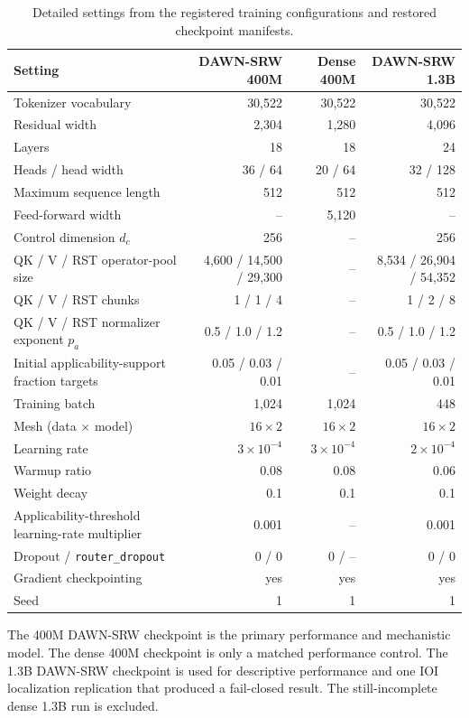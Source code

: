 \documentclass{article}
\newcommand{\DAWN}{DAWN-SRW}
\begin{document}
\begin{table}[!t]
\centering
\caption{Detailed settings from the registered training configurations and
restored checkpoint manifests.}
\scriptsize
\renewcommand{\arraystretch}{0.94}
\begin{tabular}{lrrr}
\toprule
Setting & \DAWN{} 400M & Dense 400M & \DAWN{} 1.3B\\
\midrule
Tokenizer vocabulary & 30,522 & 30,522 & 30,522\\
Residual width & 2,304 & 1,280 & 4,096\\
Layers & 18 & 18 & 24\\
Heads / head width & 36 / 64 & 20 / 64 & 32 / 128\\
Maximum sequence length & 512 & 512 & 512\\
Feed-forward width & -- & 5,120 & --\\
Control dimension \(d_c\) & 256 & -- & 256\\
QK / V / RST operator-pool size & 4,600 / 14,500 / 29,300 & -- &
8,534 / 26,904 / 54,352\\
QK / V / RST chunks & 1 / 1 / 4 & -- & 1 / 2 / 8\\
QK / V / RST normalizer exponent \(p_a\) & 0.5 / 1.0 / 1.2 & -- &
0.5 / 1.0 / 1.2\\
Initial applicability-support fraction targets & 0.05 / 0.03 / 0.01 & -- &
0.05 / 0.03 / 0.01\\
Training batch & 1,024 & 1,024 & 448\\
Mesh (data \(\times\) model) & \(16\times2\) & \(16\times2\) & \(16\times2\)\\
Learning rate & \(3\times10^{-4}\) & \(3\times10^{-4}\) & \(2\times10^{-4}\)\\
Warmup ratio & 0.08 & 0.08 & 0.06\\
Weight decay & 0.1 & 0.1 & 0.1\\
Applicability-threshold learning-rate multiplier & 0.001 & -- & 0.001\\
Dropout / \texttt{router\_dropout} & 0 / 0 & 0 / -- & 0 / 0\\
Gradient checkpointing & yes & yes & yes\\
Seed & 1 & 1 & 1\\
\bottomrule
\end{tabular}
\end{table}

The 400M \DAWN{} checkpoint is the primary performance and mechanistic model.
The dense 400M checkpoint is only a matched performance control. The 1.3B
\DAWN{} checkpoint is used for descriptive performance and one IOI localization
replication that produced a fail-closed result. The still-incomplete dense 1.3B
run is excluded.
\end{document}
